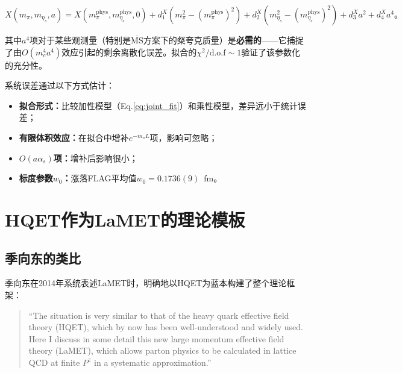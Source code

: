 \documentclass[12pt,a4paper]{ctexart}
\theoremstyle{definition}
\begin{document}
\begin{equation}
X(m_\pi, m_{\eta_s}, a) = X(m^{\text{phys}}_\pi, m^{\text{phys}}_{\eta_s}, 0) + d^X_1 (m^2_\pi - (m^{\text{phys}}_\pi)^2) + d^X_2 (m^2_{\eta_s} - (m^{\text{phys}}_{\eta_s})^2) + d^X_3 a^2 + d^X_4 a^4。
\label{eq:joint_fit}
\end{equation}

其中$a^4$项对于某些观测量（特别是$\overline{\text{MS}}$方案下的粲夸克质量）是\textbf{必需的}——它捕捉了由$O(m^4_c a^4)$效应引起的剩余离散化误差。拟合的$\chi^2/\text{d.o.f} \sim 1$验证了该参数化的充分性。

系统误差通过以下方式估计：
\begin{itemize}
    \item \textbf{拟合形式：}比较加性模型（Eq.\ref{eq:joint_fit}）和乘性模型，差异远小于统计误差；
    \item \textbf{有限体积效应：}在拟合中增补$e^{-m_\pi L}$项，影响可忽略；
    \item \textbf{$O(a\alpha_s)$项：}增补后影响很小；
    \item \textbf{标度参数$w_0$：}涨落FLAG平均值$w_0 = 0.1736(9)$~fm。
\end{itemize}

\section{HQET作为LaMET的理论模板}

\subsection{季向东的类比}

季向东在2014年系统表述LaMET时\cite{Ji2014LaMET}，明确地以HQET为蓝本构建了整个理论框架：

\begin{quote}
``The situation is very similar to that of the heavy quark effective field theory (HQET), which by now has been well-understood and widely used. Here I discuss in some detail this new large momentum effective field theory (LaMET), which allows parton physics to be calculated in lattice QCD at finite $P^z$ in a systematic approximation.''
\end{quote}
\end{document}
